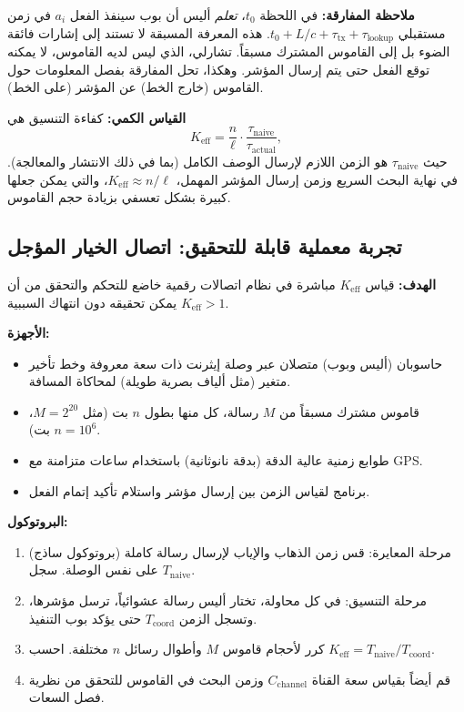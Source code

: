 \documentclass[11pt,a4paper]{article}
\begin{document}
	\textbf{ملاحظة المفارقة:}
	في اللحظة \(t_0\)، \emph{تعلم} أليس أن بوب سينفذ الفعل \(a_i\) في زمن مستقبلي \(t_0 + L/c + \tau_{\text{tx}} + \tau_{\text{lookup}}\). هذه المعرفة المسبقة لا تستند إلى إشارات فائقة الضوء بل إلى القاموس المشترك مسبقاً. تشارلي، الذي ليس لديه القاموس، لا يمكنه توقع الفعل حتى يتم إرسال المؤشر. وهكذا، تحل المفارقة بفصل المعلومات حول القاموس (خارج الخط) عن المؤشر (على الخط).
	
	\textbf{القياس الكمي:}
	كفاءة التنسيق هي
	\[
	K_{\mathrm{eff}} = \frac{n}{\ell} \cdot \frac{\tau_{\text{naive}}}{\tau_{\text{actual}}},
	\]
	حيث \(\tau_{\text{naive}}\) هو الزمن اللازم لإرسال الوصف الكامل (بما في ذلك الانتشار والمعالجة). في نهاية البحث السريع وزمن إرسال المؤشر المهمل، \(K_{\mathrm{eff}} \approx n/\ell\)، والتي يمكن جعلها كبيرة بشكل تعسفي بزيادة حجم القاموس.
	
	\subsection{تجربة معملية قابلة للتحقيق: اتصال الخيار المؤجل}
	\label{subsec:lab-delayed-choice}
	
	\textbf{الهدف:} قياس \(K_{\mathrm{eff}}\) مباشرة في نظام اتصالات رقمية خاضع للتحكم والتحقق من أن \(K_{\mathrm{eff}} > 1\) يمكن تحقيقه دون انتهاك السببية.
	
	\textbf{الأجهزة:}
	\begin{itemize}
		\item حاسوبان (أليس وبوب) متصلان عبر وصلة إيثرنت ذات سعة معروفة وخط تأخير متغير (مثل ألياف بصرية طويلة) لمحاكاة المسافة.
		\item قاموس مشترك مسبقاً من \(M\) رسالة، كل منها بطول \(n\) بت (مثل \(M = 2^{20}\)، \(n = 10^6\) بت).
		\item طوابع زمنية عالية الدقة (بدقة نانوثانية) باستخدام ساعات متزامنة مع GPS.
		\item برنامج لقياس الزمن بين إرسال مؤشر واستلام تأكيد إتمام الفعل.
	\end{itemize}
	
	\textbf{البروتوكول:}
	\begin{enumerate}
		\item مرحلة المعايرة: قس زمن الذهاب والإياب لإرسال رسالة كاملة (بروتوكول ساذج) على نفس الوصلة. سجل \(T_{\text{naive}}\).
		\item مرحلة التنسيق: في كل محاولة، تختار أليس رسالة عشوائياً، ترسل مؤشرها، وتسجل الزمن \(T_{\text{coord}}\) حتى يؤكد بوب التنفيذ.
		\item كرر لأحجام قاموس \(M\) وأطوال رسائل \(n\) مختلفة. احسب \(K_{\mathrm{eff}} = T_{\text{naive}} / T_{\text{coord}}\).
		\item قم أيضاً بقياس سعة القناة \(C_{\text{channel}}\) وزمن البحث في القاموس للتحقق من نظرية فصل السعات.
	\end{enumerate}
	
\end{document}
